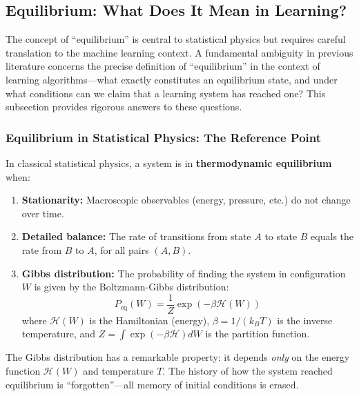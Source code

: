 \documentclass[
  journal=largetwo,
  year=2025,
  volume=37,
]{cup-journal}
\begin{document}
\subsection{Equilibrium: What Does It Mean in Learning?}

The concept of ``equilibrium'' is central to statistical physics but requires careful translation to the machine learning context. A fundamental ambiguity in previous literature concerns the precise definition of ``equilibrium'' in the context of learning algorithms---what exactly constitutes an equilibrium state, and under what conditions can we claim that a learning system has reached one? This subsection provides rigorous answers to these questions.

\subsubsection{Equilibrium in Statistical Physics: The Reference Point}

\begin{definition}\label{def:thermo_equil}
In classical statistical physics, a system is in \textbf{thermodynamic equilibrium} when:
\begin{enumerate}
    \item \textbf{Stationarity:} Macroscopic observables (energy, pressure, etc.) do not change over time.
    \item \textbf{Detailed balance:} The rate of transitions from state $A$ to state $B$ equals the rate from $B$ to $A$, for all pairs $(A, B)$.
    \item \textbf{Gibbs distribution:} The probability of finding the system in configuration $W$ is given by the Boltzmann-Gibbs distribution:
    \begin{equation}\label{eq:gibbs_dist}
        P_{\text{eq}}(W) = \frac{1}{Z} \exp\left( -\beta \mathcal{H}(W) \right)
    \end{equation}
    where $\mathcal{H}(W)$ is the Hamiltonian (energy), $\beta = 1/(k_B T)$ is the inverse temperature, and $Z = \int \exp(-\beta \mathcal{H}) dW$ is the partition function.
\end{enumerate}
\end{definition}

The Gibbs distribution has a remarkable property: it depends \textit{only} on the energy function $\mathcal{H}(W)$ and temperature $T$. The history of how the system reached equilibrium is ``forgotten''---all memory of initial conditions is erased.
\end{document}
